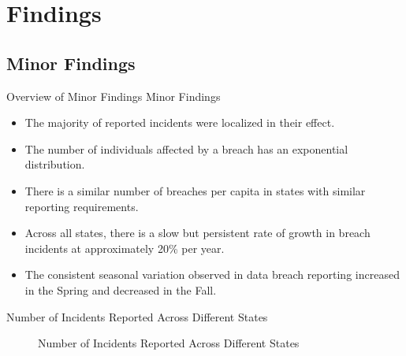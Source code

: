 \documentclass[10pt]{beamer}
\begin{document}
\section{Findings}

\subsection{Minor Findings}

\begin{frame}{Overview of Minor Findings}
    Minor Findings
    \begin{itemize}
        \item The majority of reported incidents were localized in their effect.
        \item The number of individuals affected by a breach has an exponential distribution.
        \item There is a similar number of breaches per capita in states with similar reporting requirements. 
        \item Across all states, there is a slow but persistent rate of growth in breach incidents at approximately 20\% per year.
        \item The consistent seasonal variation observed in data breach reporting increased in the Spring and decreased in the Fall.

    \end{itemize}
\end{frame}

\begin{frame}{Number of Incidents Reported Across Different States}
\begin{figure}[!htb]
    
    \caption{Number of Incidents Reported Across Different States} \label{fig:statedistrib}
\end{figure}
\end{frame}
\end{document}
